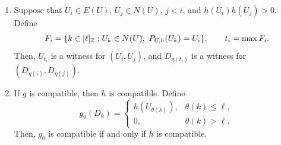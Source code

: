 \begin{lemma}
\begin{enumerate}
\begin{enumerate}[label=(\alph*),ref=\theenumi(\alph*)]
Thus, $\iota$ restricts to a bijection between these two witness sets.
\end{enumerate}
\item\label{c:cyclic-reversed-witness} Suppose that $U_i\in E(U)$, $U_j\in N(U)$,
$j<i$, and $h(U_i)h(U_j)>0$. Define
\[
 F_i=\{k\in[\ell]_{\Z}:U_k\in N(U),\ P_{U,h}(U_k)=U_i\},
 \qquad t_i=\max F_i.
\]
Then, $U_{t_i}$ is a witness for $(U_i,U_j)$, and $D_{\eta(t_i)}$ is a witness
for $(D_{\eta(i)},D_{\eta(j)})$.
\item\label{c:cyclic-zero-extension} If $g$ is compatible, then $h$ is compatible.
Define
\[
 g_0(D_k)=\begin{cases}
 h(U_{\theta(k)}),&\theta(k)\le\ell,\\
 0,&\theta(k)>\ell.
 \end{cases}
\]
Then, $g_0$ is compatible if and only if $h$ is compatible.
\end{enumerate}
\end{lemma}
